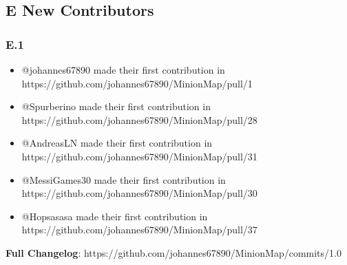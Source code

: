 \hypertarget{new-contributors}{%
\subsection*{E New Contributors}\label{new-contributors}}
\subsubsection*{E.1}

\begin{itemize}
\tightlist
\item
  @johannes67890 made their first contribution in\\
  https://github.com/johannes67890/MinionMap/pull/1
\item
  @Spurberino made their first contribution in\\
  https://github.com/johannes67890/MinionMap/pull/28
\item
  @AndreasLN made their first contribution in\\
  https://github.com/johannes67890/MinionMap/pull/31
\item
  @MessiGames30 made their first contribution in\\
  https://github.com/johannes67890/MinionMap/pull/30
\item
  @Hopsasasa made their first contribution in\\
  https://github.com/johannes67890/MinionMap/pull/37
\end{itemize}

\textbf{Full Changelog}:
https://github.com/johannes67890/MinionMap/commits/1.0

